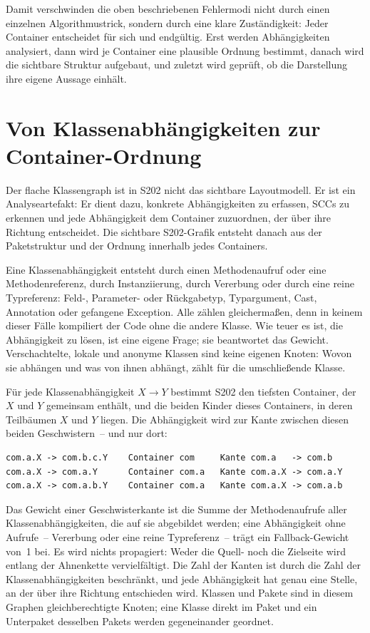 \documentclass[a4paper,11pt]{article}
\begin{document}
Damit verschwinden die oben beschriebenen Fehlermodi nicht durch einen einzelnen
Algorithmustrick, sondern durch eine klare Zust\"andigkeit: Jeder Container
entscheidet f\"ur sich und endg\"ultig. Erst werden Abh\"angigkeiten analysiert,
dann wird je Container eine plausible Ordnung bestimmt, danach wird die
sichtbare Struktur aufgebaut, und zuletzt wird gepr\"uft, ob die Darstellung
ihre eigene Aussage einh\"alt.

\section{Von Klassenabh\"angigkeiten zur Container-Ordnung}

Der flache Klassengraph ist in S202 nicht das sichtbare Layoutmodell. Er ist
ein Analyseartefakt: Er dient dazu, konkrete Abh\"angigkeiten zu erfassen, SCCs
zu erkennen und jede Abh\"angigkeit dem Container zuzuordnen, der \"uber ihre
Richtung entscheidet. Die sichtbare S202-Grafik entsteht danach aus der
Paketstruktur und der Ordnung innerhalb jedes Containers.

Eine Klassenabh\"angigkeit entsteht durch einen Methodenaufruf oder eine
Methodenreferenz, durch Instanziierung, durch Vererbung oder durch eine reine
Typreferenz: Feld-, Parameter- oder R\"uckgabetyp, Typargument, Cast, Annotation
oder gefangene Exception. Alle z\"ahlen gleicherma\ss{}en, denn in keinem dieser
F\"alle kompiliert der Code ohne die andere Klasse. Wie teuer es ist, die
Abh\"angigkeit zu l\"osen, ist eine eigene Frage; sie beantwortet das Gewicht.
Verschachtelte, lokale und anonyme Klassen sind keine eigenen Knoten: Wovon sie
abh\"angen und was von ihnen abh\"angt, z\"ahlt f\"ur die umschlie\ss{}ende Klasse.

F\"ur jede Klassenabh\"angigkeit $X \to Y$ bestimmt S202 den tiefsten Container,
der $X$ und $Y$ gemeinsam enth\"alt, und die beiden Kinder dieses Containers,
in deren Teilb\"aumen $X$ und $Y$ liegen. Die Abh\"angigkeit wird zur Kante
zwischen diesen beiden Geschwistern~-- und nur dort:

\begin{lstlisting}
com.a.X -> com.b.c.Y    Container com     Kante com.a   -> com.b
com.a.X -> com.a.Y      Container com.a   Kante com.a.X -> com.a.Y
com.a.X -> com.a.b.Y    Container com.a   Kante com.a.X -> com.a.b
\end{lstlisting}

Das Gewicht einer Geschwisterkante ist die Summe der Methodenaufrufe aller
Klassenabh\"angigkeiten, die auf sie abgebildet werden; eine Abh\"angigkeit
ohne Aufrufe~-- Vererbung oder eine reine Typreferenz~-- tr\"agt ein
Fallback-Gewicht von~1 bei. Es wird nichts
propagiert: Weder die Quell- noch die Zielseite wird entlang der Ahnenkette
vervielf\"altigt. Die Zahl der Kanten ist durch die Zahl der
Klassenabh\"angigkeiten beschr\"ankt, und jede Abh\"angigkeit hat genau eine
Stelle, an der \"uber ihre Richtung entschieden wird. Klassen und Pakete sind in
diesem Graphen gleichberechtigte Knoten; eine Klasse direkt im Paket und ein
Unterpaket desselben Pakets werden gegeneinander geordnet.
\end{document}
